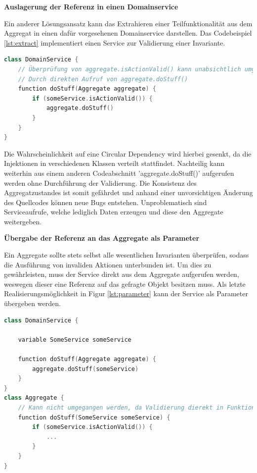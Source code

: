 \textbf{Auslagerung der Referenz in einen Domainservice}

Ein anderer Lösungsansatz kann das Extrahieren einer Teilfunktionalität aus dem Aggregat in einen dafür vorgesehenen Domainservice darstellen. Das Codebeispiel \ref{lst:extract} implementiert einen Service zur Validierung einer Invariante. 

\begin{minipage}{\linewidth} %
	\begin{lstlisting}[caption={Auslagerung der Referenz in einen Domainservice}, label={lst:extract}, language=Kotlin]
class DomainService {
	// Überprüfung von aggregate.isActionValid() kann unabsichtlich umgangen werden
	// Durch direkten Aufruf von aggregate.doStuff()
	function doStuff(Aggregate aggregate) {
		if (someService.isActionValid()) {     
			aggregate.doStuff()
		}
	}
}
	\end{lstlisting}
\end{minipage}

Die Wahrscheinlichkeit auf eine Circular Dependency wird hierbei gesenkt, da die Injektionen in verschiedenen Klassen verteilt stattfindet. Nachteilig kann weiterhin aus einem anderen Codeabschnitt 'aggregate.doStuff()' aufgerufen werden ohne Durchführung der Validierung. Die Konsistenz des Aggregatzustandes ist somit gefährdet und anhand einer unvorsichtigen Änderung des Quellcodes können neue Bugs entstehen. Unproblematisch sind Serviceaufrufe, welche lediglich Daten erzeugen und diese den Aggregate weitergeben.

\textbf{Übergabe der Referenz an das Aggregate als Parameter}

Ein Aggregate sollte stets selbst alle wesentlichen Invarianten überprüfen, sodass die Ausführung von invaliden Aktionen unterbunden ist. Um dies zu gewährleisten, muss der Service direkt aus dem Aggregate aufgerufen werden, weswegen dieser eine Referenz auf das gefragte Objekt besitzen muss. Als letzte Realisierungsmöglichkeit in Figur \ref{lst:parameter} kann der Service als Parameter übergeben werden.

\begin{minipage}{\linewidth} %
	\begin{lstlisting}[caption={Übergabe der Referenz an das Aggregate als Parameter}, label={lst:parameter}, language=Kotlin]
class DomainService {
	
	variable SomeService someService
	
	function doStuff(Aggregate aggregate) {
		aggregate.doStuff(someService)
	}
}
class Aggregate {
	// Kann nicht umgegangen werden, da Validierung dierekt in Funktion geschieht
	function doStuff(SomeService someService) {
		if (someService.isActionValid()) {
			...
		}
	}
}
	\end{lstlisting}
\end{minipage}

